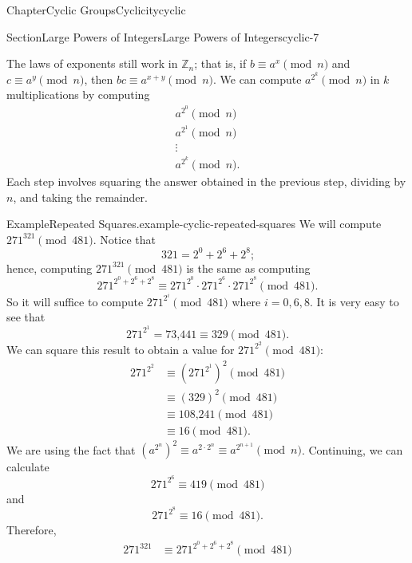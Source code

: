 \documentclass[oneside,10pt,]{book}
\numberwithin{equation}{section}
\begin{document}
\begin{chapterptx}{Chapter}{Cyclic Groups}{}{Cyclicity}{}{}{cyclic}
\begin{sectionptx}{Section}{Large Powers of Integers}{}{Large Powers of Integers}{}{}{cyclic-7}
\par
The laws of exponents still work in \({\mathbb Z}_n\); that is, if \(b \equiv a^x \pmod{ n}\) and \(c \equiv a^y \pmod{ n}\), then \(bc \equiv a^{x+y} \pmod{ n}\). We can compute \(a^{2^k} \pmod{ n}\) in \(k\) multiplications by computing%
\begin{gather*}
a^{2^0} \pmod{ n}\\
a^{2^1} \pmod{ n }\\
\vdots\\
a^{2^k} \pmod{ n}\text{.}
\end{gather*}
Each step involves squaring the answer obtained in the previous step, dividing by \(n\), and taking the remainder.%
\begin{example}{Example}{Repeated Squares.}{example-cyclic-repeated-squares}%
We will compute \(271^{321} \pmod{ 481}\). Notice that%
\begin{equation*}
321 = 2^0 +2^6 + 2^8\text{;}
\end{equation*}
hence, computing \(271^{321} \pmod{ 481}\) is the same as computing%
\begin{equation*}
271^{2^0 +2^6 + 2^8 } \equiv 271^{2^0} \cdot 271^{2^6} \cdot 271^{2^8} \pmod{481}\text{.}
\end{equation*}
So it will suffice to compute \(271^{2^i} \pmod{481}\) where \(i = 0, 6, 8\). It is very easy to see that%
\begin{equation*}
271^{2^1}  = \mbox{73,441} \equiv 329 \pmod{481}\text{.}
\end{equation*}
We can square this result to obtain a value for \(271^{2^2} \pmod{481}\):%
\begin{align*}
271^{ 2^2}  & \equiv (271^{ 2^1})^2 \pmod{ 481}\\
& \equiv (329)^2 \pmod{ 481}\\
& \equiv \mbox{108,241} \pmod{ 481}\\
& \equiv 16 \pmod{ 481}\text{.}
\end{align*}
We are using the fact that \((a^{2^n})^2  \equiv a^{2 \cdot 2^n} \equiv a^{ 2^{n+1} } \pmod{ n}\). Continuing, we can calculate%
\begin{equation*}
271^{ 2^6 } \equiv 419 \pmod{ 481}
\end{equation*}
and%
\begin{equation*}
271^{ 2^8 }  \equiv 16 \pmod{ 481}\text{.}
\end{equation*}
Therefore,%
\begin{align*}
271^{ 321} & \equiv 271^{ 2^0 +2^6 + 2^8 } \pmod{ 481}\\

\end{align*}
\end{example}
\end{sectionptx}
\end{chapterptx}
\end{document}

